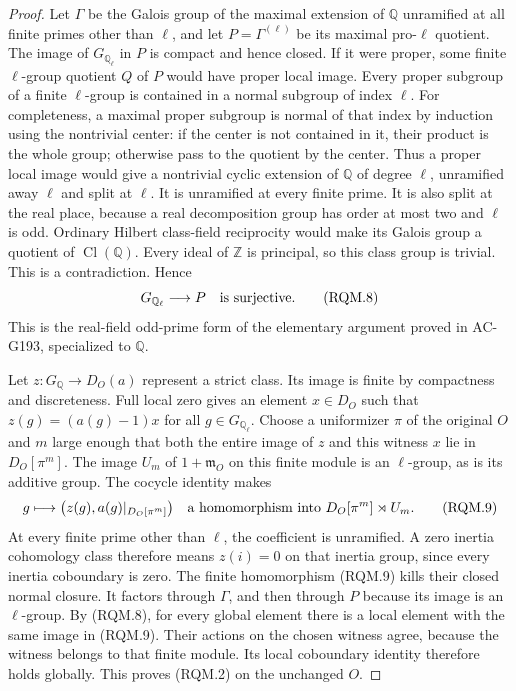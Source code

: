 \begin{proof}
Let $\Gamma$ be the Galois group of the maximal extension of
$\mathbb Q$ unramified at all finite primes other than $\ell$,
and let $P=\Gamma^{(\ell)}$ be its maximal pro-$\ell$ quotient.
The image of $G_{\mathbb Q_\ell}$ in $P$ is compact and hence closed.
If it were proper, some finite $\ell$-group quotient $Q$ of $P$
would have proper local image. Every proper subgroup of a finite
$\ell$-group is contained in a normal subgroup of index $\ell$.
For completeness, a maximal proper subgroup is normal of that
index by induction using the nontrivial center: if the center is
not contained in it, their product is the whole group; otherwise
pass to the quotient by the center.
Thus a proper local image would give a nontrivial cyclic extension
of $\mathbb Q$ of degree $\ell$, unramified away $\ell$ and split
at $\ell$. It is unramified at every finite prime.
It is also split at the real place, because a real decomposition
group has order at most two and $\ell$ is odd.
Ordinary Hilbert class-field reciprocity would make its Galois
group a quotient of $\operatorname{Cl}(\mathbb Q)$.
Every ideal of $\mathbb Z$ is principal, so this class group is
trivial. This is a contradiction. Hence
\[
                      G_{\mathbb Q_\ell}\longrightarrow P
                                 \quad\hbox{is surjective}.
 \tag{RQM.8}
\]
This is the real-field odd-prime form of the elementary argument
proved in AC-G193, specialized to $\mathbb Q$.

Let $z:G_{\mathbb Q}\to D_O(a)$ represent a strict class.
Its image is finite by compactness and discreteness.
Full local zero gives an element $x\in D_O$ such that
$z(g)=(a(g)-1)x$ for all $g\in G_{\mathbb Q_\ell}$.
Choose a uniformizer $\pi$ of the original $O$ and $m$ large
enough that both the entire image of $z$ and this witness $x$
lie in $D_O[\pi^m]$.
The image $U_m$ of $1+\mathfrak m_O$ on this finite module is
an $\ell$-group, as is its additive group. The cocycle identity
makes
\[
 g\longmapsto\bigl(z(g),a(g)|_{D_O[\pi^m]}\bigr)
       \quad\hbox{a homomorphism into }D_O[\pi^m]\rtimes U_m.
 \tag{RQM.9}
\]
At every finite prime other than $\ell$, the coefficient is
unramified. A zero inertia cohomology class therefore means
$z(i)=0$ on that inertia group, since every inertia coboundary
is zero. The finite homomorphism (RQM.9) kills their closed
normal closure. It factors through $\Gamma$, and then through
$P$ because its image is an $\ell$-group.
By (RQM.8), for every global element there is a local element
with the same image in (RQM.9). Their actions on the chosen
witness agree, because the witness belongs to that finite module.
Its local coboundary identity therefore holds globally.
This proves (RQM.2) on the unchanged $O$.


\end{proof}
